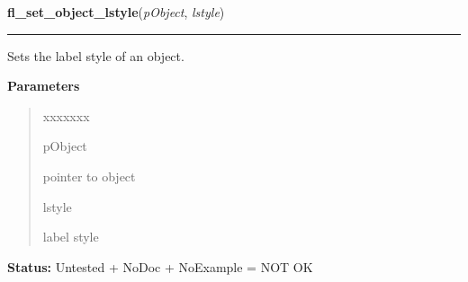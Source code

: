 \hspace{.8\funcindent}\begin{boxedminipage}{\funcwidth}

    \raggedright \textbf{fl\_set\_object\_lstyle}(\textit{pObject}, \textit{lstyle})

    \vspace{-1.5ex}

    \rule{\textwidth}{0.5\fboxrule}
\setlength{\parskip}{2ex}
    Sets the label style of an object.

\setlength{\parskip}{1ex}
      \textbf{Parameters}
      \vspace{-1ex}

      \begin{quote}
        \begin{Ventry}{xxxxxxx}

          \item[pObject]

          pointer to object

          \item[lstyle]

          label style

        \end{Ventry}

      \end{quote}

\textbf{Status:} Untested + NoDoc + NoExample = NOT OK



    \end{boxedminipage}

    \label{xformslib:library:fl_get_object_lstyle}

    \vspace{0.5ex}

